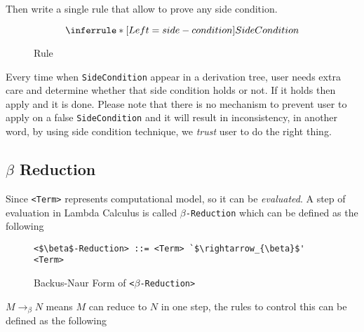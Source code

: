 \documentclass[master.tex]{subfiles}
\begin{document}
Then write a single rule that allow to prove any side condition.

\begin{figure}[H]
\begin{framed}
\centering
$$
\derivRule{side-condition}{SideCondition}{ }
$$
\end{framed}
\caption{Rule }
\end{figure}

Every time when \texttt{SideCondition} appear in a derivation tree, user needs
extra care and determine whether that side condition holds or not. If it holds
then apply  and it is done. Please note that there is no
mechanism to prevent user to apply  on a false
\texttt{SideCondition} and it will result in inconsistency, in another word, by
using side condition technique, we \emph{trust} user to do the right thing.

\subsection{$\beta$ Reduction}

Since \texttt{<Term>} represents computational model, so it can be
\emph{evaluated}. A step of evaluation in Lambda Calculus is called
\texttt{$\beta$-Reduction} which can be defined as the following


\begin{figure}[H]
\begin{framed}
\begin{lstlisting}[style=bnf]
<$\beta$-Reduction> ::= <Term> `$\rightarrow_{\beta}$' <Term>
\end{lstlisting}
\end{framed}
\caption{Backus-Naur Form of \texttt{<$\beta$-Reduction>}}
\end{figure}

$M \rightarrow_{\beta} N$ means $M$ can reduce to $N$ in one step, the rules to
control this can be defined as the following
\end{document}
